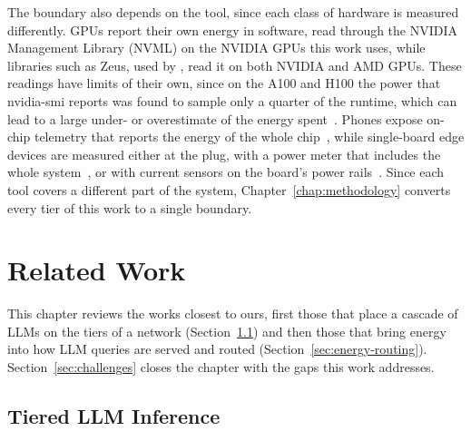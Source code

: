 \documentclass[cic,dipl,english]{infufrgs}
\begin{document}
The boundary also depends on the tool, since each class of hardware is measured
differently. GPUs report their own energy in software, read through the NVIDIA
Management Library (NVML) on the NVIDIA GPUs this work uses, while libraries such as
Zeus, used by , read it on both NVIDIA and AMD GPUs.
These readings have limits of their own, since on the A100 and H100 the power that
nvidia-smi reports was found to sample only a quarter of the runtime, which can lead to a large
under- or overestimate of the energy spent~\cite{yang2023part}. Phones expose on-chip
telemetry that reports the energy of the whole chip~\cite{cai2026npu}, while single-board
edge devices are measured either at the plug, with a power meter that includes the whole
system~\cite{renney2026cloud}, or with current sensors on the board's power
rails~\cite{tummalapalli2026edge}. Since each tool covers a different part of the
system, Chapter~\ref{chap:methodology} converts every tier of this work to a single
boundary.

\chapter{Related Work}
\label{chap:related}


This chapter reviews the works closest to ours, first those that place a cascade of LLMs
on the tiers of a network (Section~\ref{sec:tiered}) and then those that bring energy into
how LLM queries are served and routed (Section~\ref{sec:energy-routing}).
Section~\ref{sec:challenges} closes the chapter with the gaps this work addresses.

\section{Tiered LLM Inference}
\label{sec:tiered}
\end{document}
